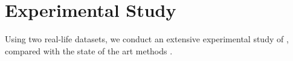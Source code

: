 \section{Experimental Study}
\label{sec-exp}

Using two real-life datasets, we conduct an extensive experimental study of , compared with the state of the art methods .



